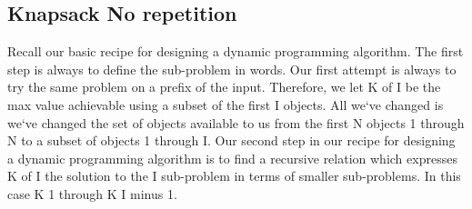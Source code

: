 \subsection{Knapsack  No repetition}
Recall our basic recipe for designing a dynamic programming algorithm.
The first step is always to define the sub-problem in words.
Our first attempt is always to try the same problem on a prefix of the input.
Therefore, we let K of I be the max value achievable using a subset of the first I objects.
All we`ve changed is we`ve changed the set of objects available to us from the first N objects 1 through N to a subset of objects 1 through I\@.
Our second step in our recipe for designing a dynamic programming algorithm is to find a recursive relation which expresses K of I the solution to the I sub-problem in terms of smaller sub-problems.
In this case K 1 through K I minus 1.

